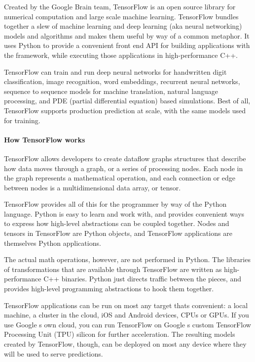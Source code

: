 \documentclass[11pt]{article}
\begin{document}
Created by the Google Brain team, TensorFlow is an open source library for numerical computation and large scale machine learning. TensorFlow bundles together a slew of machine learning and deep learning (aka neural networking) models and algorithms and makes them useful by way of a common metaphor. It uses Python to provide a convenient front end API for building applications with the framework, while executing those applications in high-performance C++.

TensorFlow can train and run deep neural networks for handwritten digit classification, image recognition, word embeddings, recurrent neural networks, sequence to sequence models for machine translation, natural language processing, and PDE (partial differential equation) based simulations. Best of all, TensorFlow supports production prediction at scale, with the same models used for training.


\paragraph{How TensorFlow works}

TensorFlow allows developers to create dataflow graphs structures that describe how data moves through a graph, or a series of processing nodes. Each node in the graph represents a mathematical operation, and each connection or edge between nodes is a multidimensional data array, or tensor.

TensorFlow provides all of this for the programmer by way of the Python language. Python is easy to learn and work with, and provides convenient ways to express how high-level abstractions can be coupled together. Nodes and tensors in TensorFlow are Python objects, and TensorFlow applications are themselves Python applications.

The actual math operations, however, are not performed in Python. The libraries of transformations that are available through TensorFlow are written as high-performance C++ binaries. Python just directs traffic between the pieces, and provides high-level programming abstractions to hook them together.

TensorFlow applications can be run on most any target that\textquotesingle s convenient: a local machine, a cluster in the cloud, iOS and Android devices, CPUs or GPUs. If you use Google \textquotesingle s own cloud, you can run TensorFlow on Google \textquotesingle s custom TensorFlow Processing Unit (TPU) silicon for further acceleration. The resulting models created by TensorFlow, though, can be deployed on most any device where they will be used to serve predictions.
\end{document}
